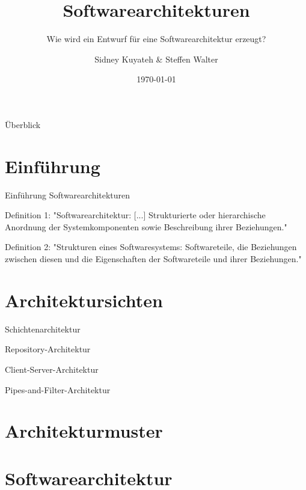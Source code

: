 \documentclass{beamer}
\title{Softwarearchitekturen}
\subtitle{Wie wird ein Entwurf für eine Softwarearchitektur erzeugt?}
\author{Sidney Kuyateh \& Steffen Walter}
\institute{Duale Hochschule Baden-Württemberg}
\date{\today}
\begin{document}
	\maketitle
	\begin{frame}{Überblick}
		\tableofcontents
	\end{frame}
		\section{Einführung}
		\begin{frame}{Einführung Softwarearchitekturen}
			\begin{block}{Definition 1:}
				"Softwarearchitektur: [...] Strukturierte oder hierarchische Anordnung der Systemkomponenten sowie Beschreibung ihrer Beziehungen." \cite[ S. 520]{balzert}
			\end{block}
			\begin{block}{Definition 2:}
				"Strukturen eines Softwaresystems: Softwareteile, die Beziehungen zwischen diesen und die Eigenschaften der Softwareteile und ihrer Beziehungen." \cite{clements}
			\end{block}
		\end{frame}
		\section{Architektursichten}
		\begin{frame}{Schichtenarchitektur}
		\end{frame}
		\begin{frame}{Repository-Architektur}
		\end{frame}	
		\begin{frame}{Client-Server-Architektur}
		\end{frame}
		\begin{frame}{Pipes-and-Filter-Architektur}
		\end{frame}
		\section{Architekturmuster}
	
	\section{Softwarearchitektur}
\end{document}
